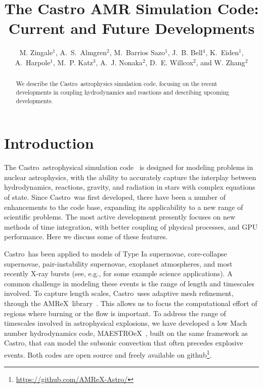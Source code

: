\documentclass[a4paper]{jpconf}
\newcommand{\maestroex}{{\sffamily MAESTROeX}}
\newcommand{\castro}{{\sffamily Castro}}
\newcommand{\amrex}{{\sffamily AMReX}}
\begin{document}
\title{The Castro AMR Simulation Code: Current and Future Developments}

\author{M. Zingale$^1$,
        A.~S.~Almgren$^2$,
        M.~Barrios Sazo$^1$,
        J.~B. Bell$^4$,
        K.~Eiden$^1$,
        A.~Harpole$^1$,
        M.~P. Katz$^3$,
        A.~J. Nonaka$^2$,
        D.~E. Willcox$^2$, and
        W. Zhang$^2$}

\address{$^1$Department of Physics and Astronomy, Stony Brook
  University, Stony Brook, NY 11794-3800 USA}

\address{$^2$Center for Computational Sciences and Engineering,
  Lawrence Berkeley National Lab, Berkeley, CA 94720 USA}

\address{$^3$NVIDIA Corporation, 2788 San Tomas Expressway,
  Santa Clara, CA, 95050 USA}


\begin{abstract}
We describe the \castro\ astrophysics simulation code, focusing on the
recent developments in coupling hydrodynamics and reactions and describing
upcoming developments.
\end{abstract}



\section{Introduction}

The \castro\ astrophysical simulation code~\cite{castro} is designed
for modeling problems in nuclear astrophysics, with the ability to
accurately capture the interplay between hydrodynamics, reactions,
gravity, and radiation in stars with complex equations of state.
Since \castro\ was first developed, there have been a number of
enhancements to the code base, expanding its applicability to a new
range of scientific problems.  The most active development presently
focuses on new methods of time integration, with better coupling of
physical processes, and GPU performance.  Here we discuss some of
these features.

\castro\ has been applied to models of Type Ia supernovae,
core-collapse supernovae, pair-instability supernovae, exoplanet
atmospheres, and most recently X-ray bursts (see, e.g.,
\cite{castro-ccsne,castro-pairinstability,polin:2019,wdmergerI} for
some example science applications).  A common challenge in modeling
these events is the range of length and timescales involved.  To
capture length scales, \castro\ uses adaptive mesh refinement, through
the \amrex\ library~\cite{amrex_joss}.  This allows us to focus the
computational effort of regions where burning or the flow is
important.  To address the range of timescales involved in
astrophysical explosions, we have developed a low Mach number
hydrodynamics code, \maestroex~\cite{maestroex}, built on the same
framework as \castro, that can model the subsonic convection that
often precedes explosive events.  Both codes are open source and
freely available on
github\footnote{\url{https://github.com/AMReX-Astro/}}.
\end{document}
